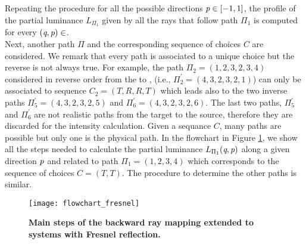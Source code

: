 Repeating the procedure for all the possible directions $\textit{p}\in[-1,1]$, the profile of the partial luminance $L_{\Pi_1}$ given by all the rays that follow path $\Pi_1$ is computed for every $(\textit{q}, \textit{p})\in$. 
\\ \indent Next, another path $\Pi$ and the corresponding sequence of choices $C$ are considered. We remark that every path is associated to a unique choice but the reverse is not always true. For example, the path $\Pi_2 = (1,2,3,2,3,4)$ considered in reverse order from the  to , (i.e., $\Pi_2^{\prime} = (4,3,2,3,2,1)$) can only be associated to sequence $C_2 = (T,R,R,T)$ which leads also to the two inverse paths $\Pi_5^{\prime}= (4,3,2,3,2,5)$ and $\Pi_6^{\prime}= (4,3,2,3,2,6)$. The last two paths, $\Pi_5^{\prime}$ and $\Pi_6^{\prime}$ are not realistic paths from the target to the source, therefore they are discarded for the intensity calculation. Given a sequance $C$, many paths are possible but only one is the physical path. In the flowchart in Figure \ref{fig:flowchart_fresnel}, we show all the steps needed to calculate the partial luminance $L_{\Pi_1}(\textit{q}, \textit{p})$  along a given direction $\textit{p}$ and related to path $\Pi_1 = (1,2,3,4)$ which corresponds to the sequence of choices $C= (T,T)$. The procedure to determine the other paths is similar.
\begin{figure}[t]
  \begin{center}
  \texttt{[image: flowchart\_fresnel]}
  \end{center}
  \caption{\textbf{Main steps of the backward ray mapping extended to systems with Fresnel reflection.}}
\label{fig:flowchart_fresnel}
 \end{figure}
